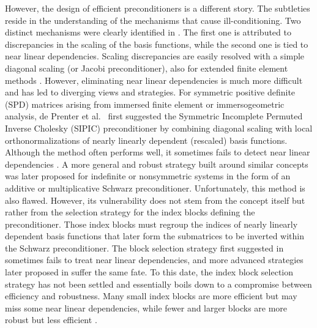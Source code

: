 \documentclass{article}
\numberwithin{equation}{section}
\theoremstyle{definition}
\begin{document}
However, the design of efficient preconditioners is a different story. The subtleties reside in the understanding of the mechanisms that cause ill-conditioning. Two distinct mechanisms were clearly identified in \cite{de2017condition}. The first one is attributed to discrepancies in the scaling of the basis functions, while the second one is tied to near linear dependencies. Scaling discrepancies are easily resolved with a simple diagonal scaling (or Jacobi preconditioner), also for extended finite element methods \cite{lehrenfeld2017optimal}. However, eliminating near linear dependencies is much more difficult and has led to diverging views and strategies. For symmetric positive definite (SPD) matrices arising from immersed finite element or immersogeometric analysis, de Prenter et al.\ \cite{de2017condition} first suggested the Symmetric Incomplete Permuted Inverse Cholesky (SIPIC) preconditioner by combining diagonal scaling with local orthonormalizations of nearly linearly dependent (rescaled) basis functions. Although the method often performs well, it sometimes fails to detect near linear dependencies \cite{de2019preconditioning}. A more general and robust strategy built around similar concepts was later proposed for indefinite or nonsymmetric systems in the form of an additive \cite{de2019preconditioning} or multiplicative \cite{de2020multigrid} Schwarz preconditioner. Unfortunately, this method is also flawed. However, its vulnerability does not stem from the concept itself but rather from the selection strategy for the index blocks defining the preconditioner. Those index blocks must regroup the indices of nearly linearly dependent basis functions that later form the submatrices to be inverted within the Schwarz preconditioner. The block selection strategy first suggested in \cite{de2019preconditioning} sometimes fails to treat near linear dependencies, and more advanced strategies later proposed in \cite{de2020multigrid} suffer the same fate. To this date, the index block selection strategy has not been settled and essentially boils down to a compromise between efficiency and robustness. Many small index blocks are more efficient but may miss some near linear dependencies, while fewer and larger blocks are more robust but less efficient \cite{de2023stability}. 
\end{document}
